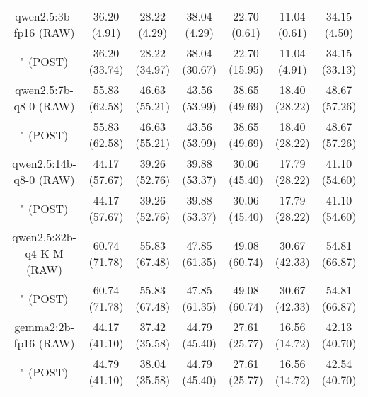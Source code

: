 \begin{table}[]
{\begin{tabular}{ccccccc}
      \multicolumn{1}{c|}{qwen2.5:3b-fp16 (RAW)} & 36.20 (4.91) & 28.22 (4.29) & \multicolumn{1}{c|}{38.04 (4.29)} & 22.70 (0.61) & \multicolumn{1}{c|}{11.04 (0.61)} & 34.15 (4.50) \\

      \multicolumn{1}{c|}{" (POST)} & 36.20 (33.74) & 28.22 (34.97) & \multicolumn{1}{c|}{38.04 (30.67)} & 22.70 (15.95) & \multicolumn{1}{c|}{11.04 (4.91)} & 34.15 (33.13) \\
      \cline{1-7}

      \multicolumn{1}{c|}{qwen2.5:7b-q8-0 (RAW)} & 55.83 (62.58) & 46.63 (55.21) & \multicolumn{1}{c|}{43.56 (53.99)} & 38.65 (49.69) & \multicolumn{1}{c|}{18.40 (28.22)} & 48.67 (57.26) \\

      \multicolumn{1}{c|}{" (POST)} & 55.83 (62.58) & 46.63 (55.21) & \multicolumn{1}{c|}{43.56 (53.99)} & 38.65 (49.69) & \multicolumn{1}{c|}{18.40 (28.22)} & 48.67 (57.26) \\
      \cline{1-7}

      \multicolumn{1}{c|}{qwen2.5:14b-q8-0 (RAW)} & 44.17 (57.67) & 39.26 (52.76) & \multicolumn{1}{c|}{39.88 (53.37)} & 30.06 (45.40) & \multicolumn{1}{c|}{17.79 (28.22)} & 41.10 (54.60) \\

      \multicolumn{1}{c|}{" (POST)} & 44.17 (57.67) & 39.26 (52.76) & \multicolumn{1}{c|}{39.88 (53.37)} & 30.06 (45.40) & \multicolumn{1}{c|}{17.79 (28.22)} & 41.10 (54.60) \\
      \cline{1-7}

      \multicolumn{1}{c|}{qwen2.5:32b-q4-K-M (RAW)} & 60.74 (71.78) & 55.83 (67.48) & \multicolumn{1}{c|}{47.85 (61.35)} & 49.08 (60.74) & \multicolumn{1}{c|}{30.67 (42.33)} & 54.81 (66.87) \\

      \multicolumn{1}{c|}{" (POST)} & 60.74 (71.78) & 55.83 (67.48) & \multicolumn{1}{c|}{47.85 (61.35)} & 49.08 (60.74) & \multicolumn{1}{c|}{30.67 (42.33)} & 54.81 (66.87) \\
      \cline{1-7}

      \multicolumn{1}{c|}{gemma2:2b-fp16 (RAW)} & 44.17 (41.10) & 37.42 (35.58) & \multicolumn{1}{c|}{44.79 (45.40)} & 27.61 (25.77) & \multicolumn{1}{c|}{16.56 (14.72)} & 42.13 (40.70) \\

      \multicolumn{1}{c|}{" (POST)} & 44.79 (41.10) & 38.04 (35.58) & \multicolumn{1}{c|}{44.79 (45.40)} & 27.61 (25.77) & \multicolumn{1}{c|}{16.56 (14.72)} & 42.54 (40.70) \\
      \cline{1-7}


\end{tabular}}
\end{table}
